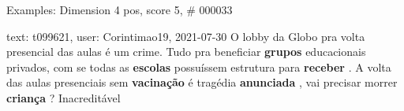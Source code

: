 \begin{frame}{Examples: Dimension 4 pos, score 5, \# 000033}
\footnotesize
\begin{exampleblock}{text: t099621, user: Corintimao19, 2021-07-30}
O lobby da Globo pra volta presencial das aulas é um crime. Tudo pra beneficiar 
\textbf{grupos} educacionais privados, com se todas as \textbf{escolas} 
possuíssem estrutura para \textbf{receber} . A volta das aulas presenciais sem 
\textbf{vacinação} é tragédia \textbf{anunciada} , vai precisar morrer 
\textbf{criança} ? Inacreditável 
\end{exampleblock}
\end{frame}
